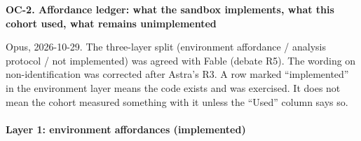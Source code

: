 \begin{landscape}

\textbf{OC-2. Affordance ledger: what the sandbox implements, what this cohort used, what remains unimplemented}


Opus, 2026-10-29. The three-layer split (environment affordance / analysis protocol / not implemented) was agreed with Fable (debate R5). The wording on non-identification was corrected after Astra's R3. A row marked ``implemented'' in the environment layer means the code exists and was exercised. It does not mean the cohort measured something with it unless the ``Used'' column says so.


\paragraph*{Layer 1: environment affordances (implemented)}


\end{landscape}
